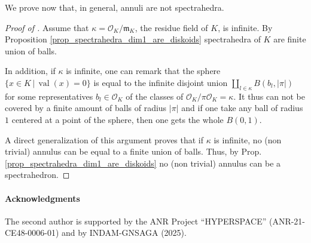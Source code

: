 \documentclass[sigconf]{acmart}
\DeclareMathOperator{\val}{val}
\newcommand{\OK}{\mathcal{O}_K}
\begin{document}
We prove now that, in general, annuli are not spectrahedra.

\begin{proof}[{Proof of }]
Assume that $\kappa = \OK/\mathfrak{m}_K$, the residue field of $K$, is infinite.
By Proposition \ref{prop_spectrahedra_dim1_are_diskoids} spectrahedra of $K$ are finite union of balls.

In addition, if $\kappa$ is infinite, one can remark that the sphere
$\{x \in K \,|\,  \val(x) =0\}$ is equal to the infinite disjoint union $\amalg_{l \in \kappa} B(b_l, \vert \pi \vert)$ for some representatives $b_l \in \OK$ of the classes of $\OK / \pi\OK = \kappa.$
It thus can not be covered by a finite amount of balls of radius $\vert \pi \vert$
and if one take any ball of radius $1$ centered at a point of the sphere, then one gets the whole
$B(0,1).$

A direct generalization of this argument proves that
if $\kappa$ is infinite, no (non trivial) annulus can be equal to
a finite union of balls. Thus, by Prop. \ref{prop_spectrahedra_dim1_are_diskoids} no (non trivial) annulus can be a spectrahedron.
\end{proof}



\paragraph*{Acknowledgments}
The second author is supported by the ANR Project ``HYPERSPACE'' (ANR-21-CE48-0006-01)
and by INDAM-GNSAGA (2025).



\end{document}
